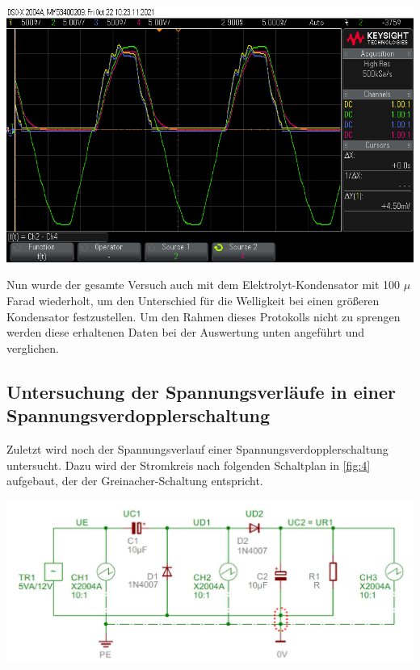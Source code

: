 \documentclass[11pt,ngerman]{scrartcl}
\begin{document}
\begin{center}
	\begin{minipage}[t]{0.8\textwidth}
		\includegraphics[width=\textwidth]{Halbleiter/scope_6}
		\label{fig:oszi_100}
	\end{minipage}
\end{center}

Nun wurde der gesamte Versuch auch mit dem Elektrolyt-Kondensator mit 100 $\mu$ Farad wiederholt, um den Unterschied für die Welligkeit bei einen größeren Kondensator festzustellen.
Um den Rahmen dieses Protokolls nicht zu sprengen werden diese erhaltenen Daten bei der Auswertung unten angeführt und verglichen.


\subsection{Untersuchung der Spannungsverläufe in einer Spannungsverdopplerschaltung}

Zuletzt wird noch der Spannungsverlauf einer Spannungsverdopplerschaltung untersucht. Dazu wird der Stromkreis nach folgenden Schaltplan in \autoref{fig:4} aufgebaut, der der Greinacher-Schaltung entspricht.

\begin{center}
	\begin{minipage}[t]{0.7\textwidth}
		\includegraphics[width=\textwidth]{skizze_4}
		\label{fig:4}
	\end{minipage}
\end{center}
\end{document}
